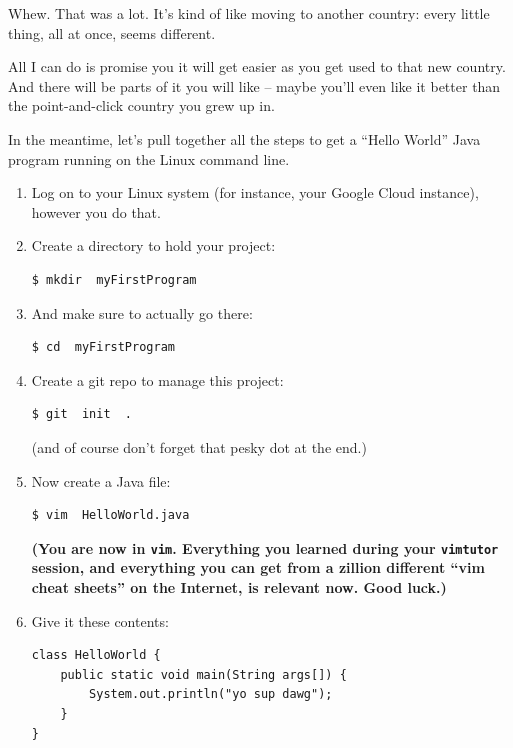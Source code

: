 Whew. That was a lot. It's kind of like moving to another country: every
little thing, all at once, seems different.

All I can do is promise you it will get easier as you get used to that new
country. And there will be parts of it you will like -- maybe you'll even like
it better than the point-and-click country you grew up in.

In the meantime, let's pull together all the steps to get a ``Hello World''
Java program running on the Linux command line.

\begin{enumerate}
\itemsep.1em
\item Log on to your Linux system (for instance, your Google Cloud instance),
however you do that.
\item Create a directory to hold your project:
\begin{Verbatim}[fontsize=\small]
$ mkdir  myFirstProgram
\end{Verbatim}

\item And make sure to actually go there:
\begin{Verbatim}[fontsize=\small]
$ cd  myFirstProgram
\end{Verbatim}

\item Create a git repo to manage this project:
\begin{Verbatim}[fontsize=\small]
$ git  init  .
\end{Verbatim}

(and of course don't forget that pesky dot at the end.)

\item Now create a Java file:
\begin{Verbatim}[fontsize=\small]
$ vim  HelloWorld.java
\end{Verbatim}

\textbf{(You are now in \texttt{vim}. Everything you learned during your
\texttt{vimtutor} session, and everything you can get from a zillion different
``vim cheat sheets'' on the Internet, is relevant now. Good luck.)}

\item Give it these contents:
\begin{samepage}
\begin{Verbatim}[fontsize=\small,frame=single]
class HelloWorld {
    public static void main(String args[]) {
        System.out.println("yo sup dawg");
    }
}
\end{Verbatim}
\end{samepage}


\end{enumerate}
